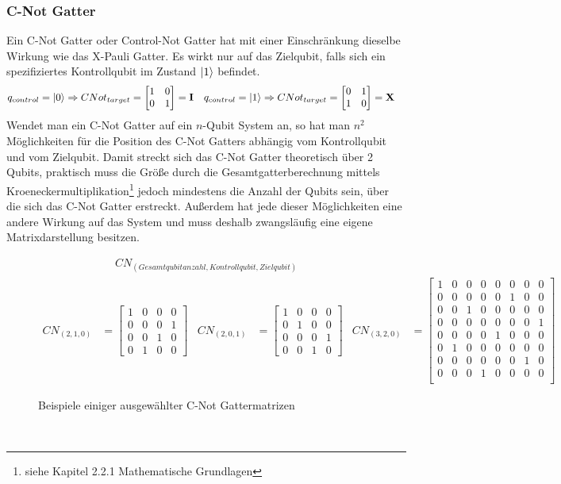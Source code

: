 \documentclass[12pt]{report}
\begin{document}
\subsubsection{C-Not Gatter}			%
Ein C-Not Gatter oder Control-Not Gatter hat mit einer Einschränkung dieselbe Wirkung wie das X-Pauli Gatter. Es wirkt nur auf das Zielqubit, falls sich ein spezifiziertes Kontrollqubit im Zustand $\ket{1}$ befindet.
\begin{align*}
	q_{control}=\ket{0} &\Rightarrow CNot_{target}=\begin{bmatrix} 1&0\\0&1 \end{bmatrix}=\text{\textbf{I}} & q_{control}=\ket{1} &\Rightarrow CNot_{target}=\begin{bmatrix} 0&1\\1&0 \end{bmatrix}=\text{\textbf{X}}
\end{align*}
Wendet man ein C-Not Gatter auf ein $n$-Qubit System an, so hat man $n^2$ Möglichkeiten für die Position des C-Not Gatters abhängig vom Kontrollqubit und vom Zielqubit. Damit streckt sich das C-Not Gatter theoretisch über 2 Qubits, praktisch muss die Größe durch die Gesamtgatterberechnung mittels Kroeneckermultiplikation\footnote{siehe Kapitel 2.2.1 Mathematische Grundlagen} jedoch mindestens die Anzahl der Qubits sein, über die sich das C-Not Gatter erstreckt. Außerdem hat jede dieser Möglichkeiten eine andere Wirkung auf das System und muss deshalb zwangsläufig eine eigene Matrixdarstellung besitzen.
\begin{figure}[h]
\begin{align*}
CN_{(Gesamtqubitanzahl, Kontrollqubit, Zielqubit)}
\end{align*}
\vspace{-1cm}
\begin{align*}
CN_{(2,1,0)} &= \left[\begin{smallmatrix} 1&0&0&0 \\0&0&0&1 \\0&0&1&0 \\0&1&0&0 \end{smallmatrix}\right] &
CN_{(2,0,1)} &= \left[\begin{smallmatrix} 1&0&0&0 \\0&1&0&0 \\0&0&0&1 \\0&0&1&0 \end{smallmatrix}\right] &
CN_{(3,2,0)} &= \left[\begin{smallmatrix} 
1&0&0&0&0&0&0&0\\
0&0&0&0&0&1&0&0\\
0&0&1&0&0&0&0&0\\
0&0&0&0&0&0&0&1\\
0&0&0&0&1&0&0&0\\
0&1&0&0&0&0&0&0\\
0&0&0&0&0&0&1&0\\
0&0&0&1&0&0&0&0\\
\end{smallmatrix}\right] &
\end{align*}
\caption{Beispiele einiger ausgewählter C-Not Gattermatrizen}
\end{figure}\\
\end{document}
